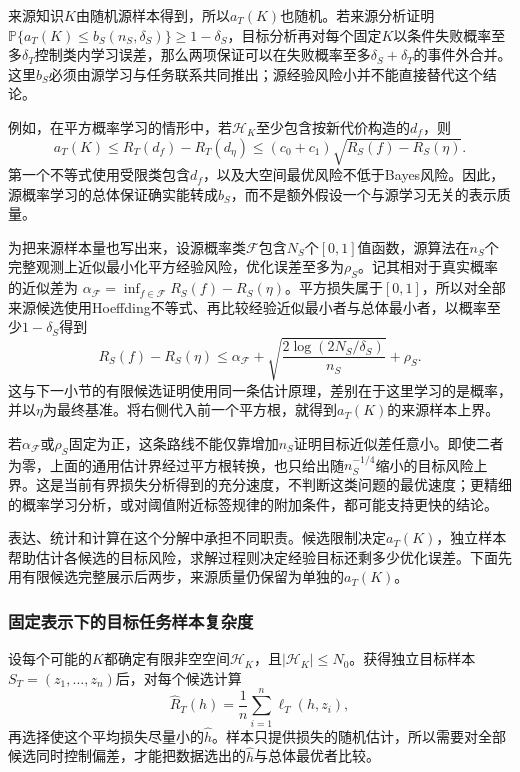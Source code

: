 来源知识$K$由随机源样本得到，所以$a_T(K)$也随机。若来源分析证明
$\mathbb P\{a_T(K)\leq b_S(n_S,\delta_S)\}\geq1-\delta_S$，目标分析再对每个固定$K$以条件失败概率至多$\delta_T$控制类内学习误差，那么两项保证可以在失败概率至多$\delta_S+\delta_T$的事件外合并。这里$b_S$必须由源学习与任务联系共同推出；源经验风险小并不能直接替代这个结论。

例如，在平方概率学习的情形中，若$\mathcal H_K$至少包含按新代价构造的$d_f$，则
\[
 a_T(K)\leq R_T(d_f)-R_T(d_\eta)
 \leq(c_0+c_1)\sqrt{R_S(f)-R_S(\eta)}.
\]
第一个不等式使用受限类包含$d_f$，以及大空间最优风险不低于Bayes风险。因此，源概率学习的总体保证确实能转成$b_S$，而不是额外假设一个与源学习无关的表示质量。

为把来源样本量也写出来，设源概率类$\mathcal F$包含$N_S$个$[0,1]$值函数，源算法在$n_S$个完整观测上近似最小化平方经验风险，优化误差至多为$\rho_S$。记其相对于真实概率的近似差为
$\alpha_{\mathcal F}=\inf_{f\in\mathcal F}R_S(f)-R_S(\eta)$。平方损失属于$[0,1]$，所以对全部来源候选使用Hoeffding不等式、再比较经验近似最小者与总体最小者，以概率至少$1-\delta_S$得到
\[
 R_S(f)-R_S(\eta)
 \leq\alpha_{\mathcal F}
     +\sqrt{\frac{2\log(2N_S/\delta_S)}{n_S}}+\rho_S.
\]
这与下一小节的有限候选证明使用同一条估计原理，差别在于这里学习的是概率，并以$\eta$为最终基准。将右侧代入前一个平方根，就得到$a_T(K)$的来源样本上界。

若$\alpha_{\mathcal F}$或$\rho_S$固定为正，这条路线不能仅靠增加$n_S$证明目标近似差任意小。即使二者为零，上面的通用估计界经过平方根转换，也只给出随$n_S^{-1/4}$缩小的目标风险上界。这是当前有界损失分析得到的充分速度，不判断这类问题的最优速度；更精细的概率学习分析，或对阈值附近标签规律的附加条件，都可能支持更快的结论。

表达、统计和计算在这个分解中承担不同职责。候选限制决定$a_T(K)$，独立样本帮助估计各候选的目标风险，求解过程则决定经验目标还剩多少优化误差。下面先用有限候选完整展示后两步，来源质量仍保留为单独的$a_T(K)$。

\subsubsection{固定表示下的目标任务样本复杂度}

设每个可能的$K$都确定有限非空空间$\mathcal H_K$，且$|\mathcal H_K|\leq N_0$。获得独立目标样本$S_T=(z_1,\ldots,z_n)$后，对每个候选计算
\[
 \widehat R_T(h)=\frac1n\sum_{i=1}^n\ell_T(h,z_i),
\]
再选择使这个平均损失尽量小的$\widehat h$。样本只提供损失的随机估计，所以需要对全部候选同时控制偏差，才能把数据选出的$\widehat h$与总体最优者比较。

